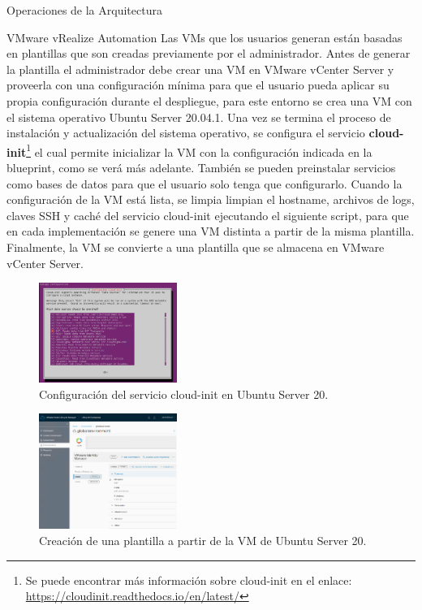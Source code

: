 \begin{subsection}{Operaciones de la Arquitectura}
\begin{subsubsection}{VMware vRealize Automation}
        Las VMs que los usuarios generan están basadas en plantillas que son creadas previamente por el administrador. Antes de generar la plantilla el administrador debe crear una VM en VMware vCenter Server y proveerla con una configuración mínima para que el usuario pueda aplicar su propia configuración durante el despliegue, para este entorno se crea una VM con el sistema operativo Ubuntu Server 20.04.1. Una vez se termina el proceso de instalación y actualización del sistema operativo, se configura el servicio \textbf{cloud-init}\footnote{Se puede encontrar más información sobre cloud-init en el enlace: \url{https://cloudinit.readthedocs.io/en/latest/}} el cual permite inicializar la VM con la configuración indicada en la blueprint, como se verá más adelante. También se pueden preinstalar servicios como bases de datos para que el usuario solo tenga que configurarlo. Cuando la configuración de la VM está lista, se limpia limpian el hostname, archivos de logs, claves SSH y caché del servicio cloud-init ejecutando el siguiente script, para que en cada implementación se genere una VM distinta a partir de la misma plantilla. Finalmente, la VM se convierte a una plantilla que se almacena en VMware vCenter Server.
        \begin{figure}[h]
            \centering
            \includegraphics[width=0.4\textwidth]{imaxes/pruebaconcepto/vrealize/install-cloud-init.png}
            \caption{Configuración del servicio cloud-init en Ubuntu Server 20.}
            \label{fig:cloud-init-config}
        \end{figure}
        \FloatBarrier
        \begin{figure}[h]
            \centering
            \includegraphics[width=0.4\textwidth]{imaxes/pruebaconcepto/vrealize/config-istance-vridm.png}
            \caption{Creación de una plantilla a partir de la VM de Ubuntu Server 20.}
            \label{fig:template-ubuntu}
        \end{figure}
        \FloatBarrier


\end{subsubsection}
\end{subsection}
